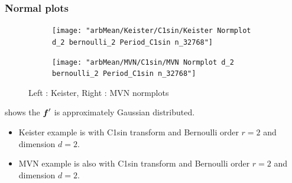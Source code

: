 \documentclass[10pt,compress,xcolor={usenames,dvipsnames}]{beamer} %
\begin{document}
\begin{frame}
\frametitle{Normal plots}
\vspace{-5ex}
\begin{figure}[htp]
\captionsetup[subfigure]{labelformat=empty}
\centering
\begin{subfigure}[b]{0.49\textwidth}
\texttt{[image: "arbMean/Keister/C1sin/Keister Normplot d\_2 bernoulli\_2 Period\_C1sin n\_32768"]}
\end{subfigure}
\centering
\begin{subfigure}[b]{0.49\textwidth}
\texttt{[image: "arbMean/MVN/C1sin/MVN Normplot d\_2 bernoulli\_2 Period\_C1sin n\_32768"]}
\end{subfigure}
\caption{ Left : Keister, Right : MVN normplots}
\end{figure}
\vspace{-3ex}
shows the $\boldsymbol{f}'$ is approximately Gaussian distributed.
\vspace{-3ex}
\begin{itemize}
\item
Keister example is with C1sin transform and Bernoulli order $r=2$ and dimension $d=2$.
\item
MVN example is also with C1sin transform and Bernoulli order $r=2$ and dimension $d=2$.
\end{itemize}
\end{frame}

\fi
\end{document}

